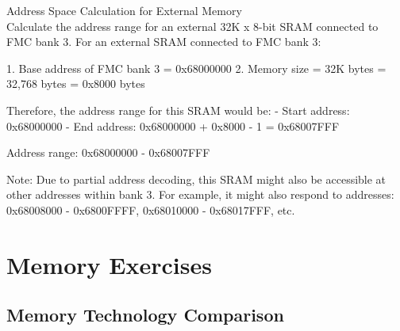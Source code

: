 \begin{example2}{Address Space Calculation for External Memory}\\
Calculate the address range for an external 32K x 8-bit SRAM connected to FMC bank 3.
\tcblower
For an external SRAM connected to FMC bank 3:

1. Base address of FMC bank 3 = 0x68000000
2. Memory size = 32K bytes = 32,768 bytes = 0x8000 bytes

Therefore, the address range for this SRAM would be:
- Start address: 0x68000000
- End address: 0x68000000 + 0x8000 - 1 = 0x68007FFF

Address range: 0x68000000 - 0x68007FFF

Note: Due to partial address decoding, this SRAM might also be accessible at other addresses within bank 3. For example, it might also respond to addresses:
0x68008000 - 0x6800FFFF, 0x68010000 - 0x68017FFF, etc.
\end{example2}

\section{Memory Exercises}

\subsection{Memory Technology Comparison}

